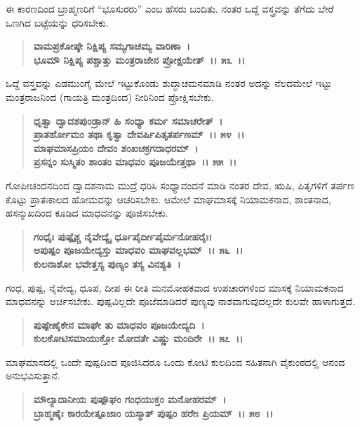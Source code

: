 ಈ ಕಾರಣದಿಂದ ಬ್ರಾಹ್ಮಣರಿಗೆ “ಭೂಸುರರು” ಎಂಬ ಹೆಸರು ಬಂದಿತು. ನಂತರ ಒದ್ದೆ ವಸ್ತ್ರವನ್ನು ತೆಗೆದು ಬೇರೆ ಒಣಗಿದ ಬಟ್ಟೆಯನ್ನು ಧರಿಸಬೇಕು.

\begin{verse}
\textbf{ವಾಮಪ್ರಕೋಷ್ಠೇ ನಿಕ್ಷಿಪ್ಯ ಸಮ್ಯಗಾಚಮ್ಯ ವಾರಿಣಾ~।}\\\textbf{ಭೂಮೌ ನಿಕ್ಷಿಪ್ಯ ಪಶ್ಚಾತ್ತು ಮಂತ್ರರಾಜೇನ ಪ್ರೋಕ್ಷಯೇತ್~।। ೫೩~।।}
\end{verse}

ಒದ್ದೆ ವಸ್ತ್ರವನ್ನು ಎಡಮುಂಗೈ ಮೇಲೆ ಇಟ್ಟುಕೊಂಡು ಶುದ್ಧಾಚಮನಮಾಡಿ ನಂತರ ಅದನ್ನು ನೆಲದಮೇಲೆ ಇಟ್ಟು ಮಂತ್ರರಾಜನಿಂದ (ಗಾಯತ್ರಿ ಮಂತ್ರದಿಂದ) ನೀರಿನಿಂದ ಪ್ರೋಕ್ಷಿಸಬೇಕು.

\begin{verse}
\textbf{ಧೃತ್ವಾ ದ್ವಾದಶಪುಂಡ್ರಾನ್ ಹಿ ಸಂಧ್ಯಾ ಕರ್ಮ ಸಮಾಚರೇತ್~।}\\\textbf{ಪ್ರಾತರ್ಹೋಮಂ ತಥಾ ಕೃತ್ವಾ ದೇವರ್ಷಿಪಿತೃತರ್ಪಣಮ್~।। ೫೪~।।}\\\textbf{ಮಾಘಮಾಸಪ್ರಿಯಂ ದೇವಂ ಶಂಖಚಕ್ರಗದಾಧರಮ್~।\\ ಪ್ರಸನ್ನಂ ಸುಸ್ಮಿತಂ ಶಾಂತಂ ಮಾಧವಂ ಪೂಜಯೇತ್ತಥಾ~।। ೫೫~।।}
\end{verse}

ಗೋಪೀಚಂದನದಿಂದ ದ್ವಾದಶನಾಮ ಮುದ್ರೆ ಧರಿಸಿ ಸಂಧ್ಯಾವಂದನೆ ಮಾಡಿ ನಂತರ ದೇವ, ಋಷಿ, ಪಿತೃಗಳಿಗೆ ತರ್ಪಣ ಕೊಟ್ಟು ಪ್ರಾತಃಕಾಲದ ಹೋಮವನ್ನು ಆಚರಿಸಬೇಕು. ಆಮೇಲೆ ಮಾಘಮಾಸಕ್ಕೆ ನಿಯಾಮಕನಾದ, ಶಾಂತನಾದ, ಹಸನ್ಮುಖದಿಂದ ಕೂಡಿದ ಮಾಧವನನ್ನು ಪೂಜಿಸಬೇಕು.

\begin{verse}
\textbf{ಗಂಧೈಃ ಪುಷ್ಪೈಶ್ಚ ನೈವೇದ್ಯೈ ರ್ಧೂಪೈರ್ದೀಪೈರ್ಮನೋಹರೈಃ।}\\\textbf{ಅಪುಷ್ಪಂ ಪೂಜಯೇದ್ಯಸ್ತು ಮಾಧವಂ ಮಾಘವಲ್ಲಭಮ್~।। ೫೬~।।}\\\textbf{ಕುಲನಾಶೋ ಭವೇತ್ತಸ್ಯ ಪುಣ್ಯಂ ತಸ್ಯ ವಿನಶ್ಯತಿ~।}
\end{verse}

ಗಂಧ, ಪುಷ್ಪ, ನೈವೇದ್ಯ, ಧೂಪ, ದೀಪ ಈ ರೀತಿ ಮನಮೋಹಕವಾದ ಉಪಚಾರಗಳಿಂದ ಮಾಸಕ್ಕೆ ನಿಯಾಮಕನಾದ ಮಾಧವನನ್ನು ಅರ್ಚಿಸಬೇಕು. ಪುಷ್ಪವಿಲ್ಲದೇ ಪೂಜೆಮಾಡಿದರೆ ಪುಣ್ಯವು ನಾಶವಾಗುವುದಲ್ಲದೇ ಕುಲವೇ ಹಾಳಾಗುತ್ತದೆ.

\begin{verse}
\textbf{ಪುಷ್ಪೇಣೈಕೇನ ಮಾಘೇ ತು ಮಾಧವಂ ಪೂಜಯೇದ್ಯದಿ~।}\\\textbf{ಕುಲಕೋಟಿಸಮಾಯುಕ್ತೋ ಮೋದತೇ ವಿಷ್ಣು ಮಂದಿರೇ~।। ೫೭~।।}
\end{verse}

ಮಾಘಮಾಸದಲ್ಲಿ ಒಂದೇ ಪುಷ್ಪದಿಂದ ಪೂಜಿಸಿದರೂ ಒಂದು ಕೋಟಿ ಕುಲದಿಂದ ಸಹಿತನಾಗಿ ವೈಕುಂಠದಲ್ಲಿ ಆನಂದ ಅನುಭವಿಸುತ್ತಾನೆ.

\begin{verse}
\textbf{ಮೌಲ್ಯಾದಾನೀಯ ಪುಷ್ಪೌಘಂ ಗಂಧಯುಕ್ತಂ ಮನೋಹರಮ್~।}\\\textbf{ಬ್ರಾಹ್ಮಣೈಃ ಕಾರಯೇತ್ಪೂಜಾಂ ಯಸ್ಮಾತ್ ಪುಷ್ಪಂ ಹರೇಃ ಪ್ರಿಯಮ್~।। ೫೮~।।}
\end{verse}

